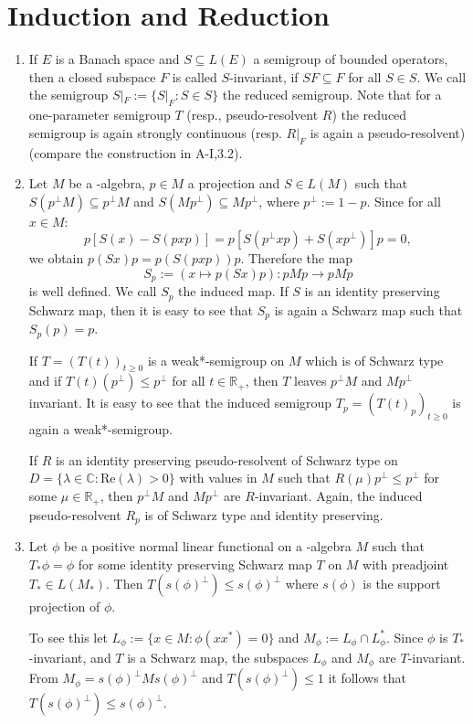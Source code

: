 
\section{Induction and Reduction}

\begin{enumerate}[1., wide]
\item
If $ E $ is a Banach space and $ S \subseteq L(E) $ a semigroup of bounded operators, then a closed subspace $ F $ is called $ S $-invariant, if $ SF \subseteq F $ for all $ S \in S $.
We call the semigroup $ S|_{F} := \{S|_{F} : S \in S \} $ the reduced semigroup.
Note that for a one-parameter semigroup $ T $ (resp., pseudo-resolvent $ R $) the reduced semigroup is again strongly continuous (resp. $ R|_{F} $ is again a pseudo-resolvent) (compare the construction in A-I,3.2).

\item
Let $ M $ be a \WA-algebra, $ p \in M $ a projection and $ S \in L(M) $ such that $ S(p^{\perp}M) \subseteq p^{\perp}M $ and $ S(Mp^{\perp}) \subseteq Mp^{\perp} $, where $ p^{\perp} := 1-p $.
Since for all $ x \in M $:
\[
p[S(x) - S(pxp)] = p[S(p^{\perp}xp) + S(xp^{\perp})]p = 0,
\]
we obtain $ p(Sx)p = p(S(pxp))p $.
Therefore the map
\[
S_{p} := (x \mapsto p(Sx)p) : pMp \to pMp
\]
is well defined.
We call $ S_{p} $ the induced map.
If $ S $ is an identity preserving Schwarz map, then it is easy to see that $ S_{p} $ is again a Schwarz map such that $ S_{p}(p) = p $.

If $ T = (T(t))_{t\geq0} $ is a weak*-semigroup on $ M $ which is of Schwarz type and if $ T(t)(p^{\perp}) \leq p^{\perp} $ for all $ t \in \mathbb{R}_{+} $, then $ T $ leaves $ p^{\perp}M $ and $ Mp^{\perp} $ invariant.
It is easy to see that the induced semigroup $ T_{p} = (T(t)_{p})_{t\geq0} $ is again a weak*-semigroup.

If $ R $ is an identity preserving pseudo-resolvent of Schwarz type on $ D = \{\lambda \in \mathbb{C} : \text{Re}(\lambda) > 0\} $ with values in $ M $ such that $ R(\mu)p^{\perp} \leq p^{\perp} $ for some $ \mu \in \mathbb{R}_{+} $, then $ p^{\perp}M $ and $ Mp^{\perp} $ are $ R $-invariant.
Again, the induced pseudo-resolvent $ R_{p} $ is of Schwarz type and identity preserving.

\item
Let $ \phi $ be a positive normal linear functional on a \WA-algebra $ M $ such that $ T_{*}\phi = \phi $ for some identity preserving Schwarz map $ T $ on $ M $ with preadjoint $ T_{*} \in L(M_{*}) $.
Then $ T(s(\phi)^{\perp}) \leq s(\phi)^{\perp} $ where $ s(\phi) $ is the support projection of $ \phi $.

To see this let $ L_{\phi} := \{x \in M: \phi(xx^{*}) = 0\} $ and $ M_{\phi} := L_{\phi} \cap L_{\phi}^{*} $.
Since $ \phi $ is $ T_{*} $-invariant, and $ T $ is a Schwarz map, the subspaces $ L_{\phi} $ and $ M_{\phi} $ are $ T $-invariant.
From $ M_{\phi} = s(\phi)^{\perp}Ms(\phi)^{\perp} $ and $ T(s(\phi)^{\perp}) \leq 1 $ it follows that $ T(s(\phi)^{\perp}) \leq s(\phi)^{\perp} $.

\end{enumerate}
%

